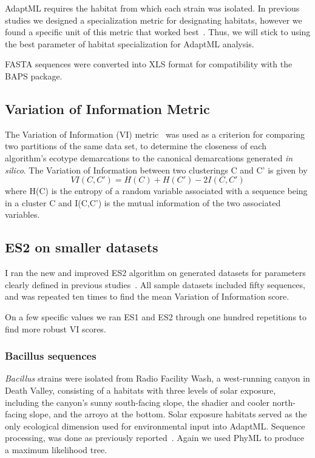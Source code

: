 AdaptML requires the habitat from which each strain was isolated.
In previous studies we designed a specialization metric for designating habitats, however we found a specific unit of this metric that worked best~\cite{carlo}.
Thus, we will stick to using the best parameter of habitat specialization for AdaptML analysis.

FASTA sequences were converted into XLS format for compatibility with the BAPS package.

\subsection*{Variation of Information Metric}
The Variation of Information (VI) metric~\cite{meilua2003comparing} was used as a criterion for comparing two partitions of the same data set, to determine the closeness of each algorithm's ecotype demarcations to the canonical demarcations generated \emph{in silico}.
The Variation of Information between two clusterings C and C' is given by$$VI(C, C') = H(C) + H(C') - 2I(C, C')$$where H(C) is the entropy of a random variable associated with a sequence being in a cluster C and I(C,C') is the mutual information of the two associated variables.

\subsection*{ES2 on smaller datasets}
I ran the new and improved ES2 algorithm on generated datasets for parameters clearly defined in previous studies~\cite{carlo}.
All sample datasets included fifty sequences, and was repeated ten times to find the mean Variation of Information score.

On a few specific values we ran ES1 and ES2 through one hundred repetitions to find more robust VI scores.

\subsubsection*{Bacillus sequences}
\emph{Bacillus} strains were isolated from Radio Facility Wash, a west-running canyon in Death Valley, consisting of a habitats with three levels of solar exposure, including the canyon's sunny south-facing slope, the shadier and cooler north-facing slope, and the arroyo at the bottom.
Solar exposure habitats served as the only ecological dimension used for environmental input into AdaptML.
Sequence processing, was done as previously reported~\cite{carlo}.
Again we used PhyML to produce a maximum likelihood tree.

